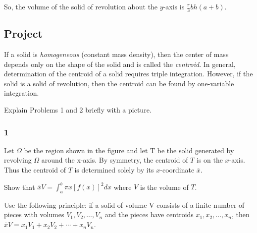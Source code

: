 \documentclass[../hw7.tex]{subfiles}
\begin{document}
So, the volume of the solid of revolution about the $y$-axis is $\frac{\pi}{3}bh(a+b)$.

\subsection*{Project}
If a solid is \textit{homogeneous} (constant mass density), then the center of mass depends only on the shape of the solid and is called the \textit{centroid}. 
In general, determination of the centroid of a solid requires triple integration.
However, if the solid is a solid of revolution, then the centroid can be found by one-variable integration.

\begin{figure*}[ht]
\centering
{} 
\end{figure*}

Explain Problems 1 and 2 briefly with a picture.

\subsubsection*{1}
Let $\Omega$ be the region shown in the figure and let T be the solid generated by revolving $\Omega$ around the x-axis. 
By symmetry, the centroid of $T$ is on the $x$-axis. Thus the centroid of $T$ is determined solely by its $x$-coordinate $\overline{x}$.

Show that $\overline{x}V=\int_{a}^{b} \pi x{[f(x)]}^2 dx$ where $V$ is the volume of $T$.

Use the following principle: if a solid of volume V consists of a finite number of pieces with volumes $V_1,V_2,\ldots,V_n$ and the pieces have centroids $x_1,x_2,\ldots,x_n$, then $\overline{x}V = x_1 V_1+x_2 V_2+\cdots+x_n V_n$.
\end{document}

